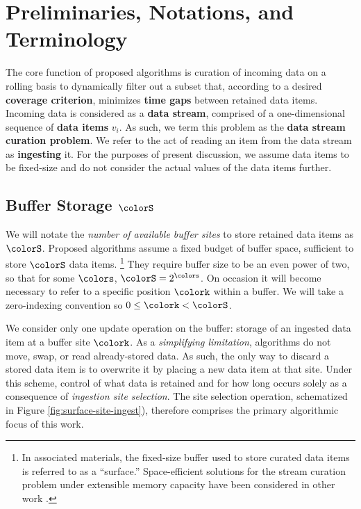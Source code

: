 \section{Preliminaries, Notations, and Terminology} \label{sec:notation}



The core function of proposed algorithms is curation of incoming data on a rolling basis to dynamically filter out a subset that, according to a desired \textbf{coverage criterion}, minimizes \textbf{time gaps} between retained data items.
Incoming data is considered as a \textbf{data stream}, comprised of a one-dimensional sequence of \textbf{data items} $v_i$.
As such, we term this problem as the \textbf{data stream curation problem}.
We refer to the act of reading an item from the data stream as \textbf{ingesting} it.
For the purposes of present discussion, we assume data items to be fixed-size and do not consider the actual values of the data items further.

\subsection{Buffer Storage $\colorS$}

We will notate the \textit{number of available buffer sites} to store retained data items as $\colorS$.
Proposed algorithms assume a fixed budget of buffer space, sufficient to store $\colorS$ data items.%
\footnote{%
In associated materials, the fixed-size buffer used to store curated data items is referred to as a ``surface.''
Space-efficient solutions for the stream curation problem under extensible memory capacity have been considered in other work \citep{moreno2024algorithms}.%
}
They require buffer size to be an even power of two, so that for some $\colors$, $\colorS = 2^{\colors}$.
On occasion it will become necessary to refer to a specific position $\colork$ within a buffer.
We will take a zero-indexing convention so $0 \leq \colork < \colorS$.

We consider only one update operation on the buffer: storage of an ingested data item at a buffer site $\colork$.
As a \textit{simplifying limitation}, algorithms do not move, swap, or read already-stored data.
As such, the only way to discard a stored data item is to overwrite it by placing a new data item at that site.
Under this scheme, control of what data is retained and for how long occurs solely as a consequence of \textit{ingestion site selection}.
The site selection operation, schematized in Figure \ref{fig:surface-site-ingest}), therefore comprises the primary algorithmic focus of this work.

